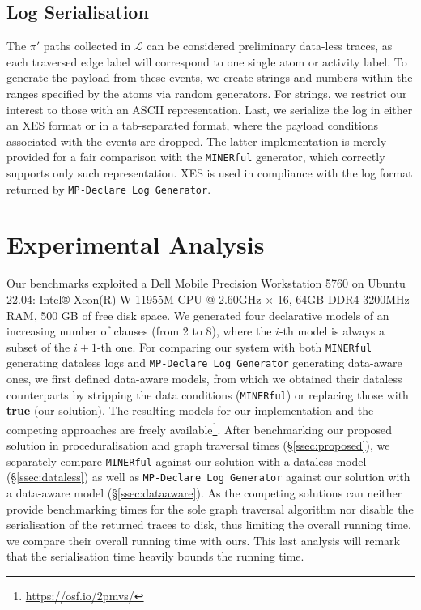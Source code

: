 \documentclass[sigconf]{acmart}
\begin{document}
\subsection{Log Serialisation}\label{sec:loggen}
The $\pi'$ paths collected in $\mathcal{L}$ can be considered preliminary data-less traces, as each traversed edge label will correspond to one single atom or activity label. 
To generate the payload from these events, we create strings and numbers within the ranges specified by the atoms via random generators. For strings, we restrict our interest to those with an ASCII representation. Last, we serialize the log in either an XES format or in a tab-separated format, where the payload conditions associated with the events are dropped. The latter implementation is merely provided for a fair comparison with the \texttt{MINERful} generator, which correctly supports only such representation. XES is used in compliance with the log format returned by \texttt{MP-Declare Log Generator}.

\section{Experimental Analysis}\label{sec:exp}
Our benchmarks exploited a Dell Mobile Precision Workstation 5760 on Ubuntu 22.04: Intel® Xeon(R) W-11955M CPU @ 2.60GHz $\times$ 16, 64GB DDR4 3200MHz RAM, 500 GB of free disk space. We generated four declarative models of an increasing number of clauses (from 2 to 8), where the $i$-th model is always a subset of the $i+1$-th one. For comparing our system with both \texttt{MINERful} generating dataless logs and
\texttt{MP-Declare Log Generator} generating data-aware ones, we first defined 
data-aware models, from which we obtained their dataless counterparts by stripping the data conditions (\texttt{MINERful}) or replacing those with \textbf{true} (our solution). The resulting models for our implementation and the competing approaches are freely available\footnote{\url{https://osf.io/2pmvs/}}. After benchmarking our proposed solution in proceduralisation and graph traversal times (\S\ref{ssec:proposed}), we separately compare \texttt{MINERful} against our solution with a dataless model (\S\ref{ssec:dataless}) as well as \texttt{MP-Declare Log Generator} against our solution with a data-aware model (\S\ref{ssec:dataaware}). As the competing solutions can neither provide benchmarking times for the sole graph traversal algorithm nor disable the serialisation of the returned traces to disk, thus limiting the overall running time, we compare their overall running time with ours. This last analysis will remark that the serialisation time heavily bounds the running time.
\end{document}
